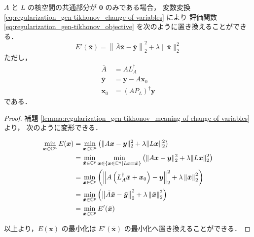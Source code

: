 \begin{theorem}
    $A$ と $L$ の核空間の共通部分が $\bm{0}$ のみである場合，
    変数変換 \eqref{eq:regularization_gen-tikhonov_change-of-variables} により
    評価関数 \eqref{eq:regularization_gen-tikhonov_objective} を次のように置き換えることができる．
    \begin{equation}
        E'(\bar{\bm{x}}) =
        \left\|\bar{A} \bar{\bm{x}} - \bar{\bm{y}}\right\|_2^2
        + \lambda \|\bar{\bm{x}}\|_2^2
    \end{equation}
    ただし，
    \begin{align}
        \bar{A}      & = A L_A^\dagger                     \\
        \bar{\bm{y}} & = \bm{y} - A \bm{x}_0               \\
        \bm{x}_0     & = \left(A P_L\right)^\dagger \bm{y}
    \end{align}
    である．
\end{theorem}
\begin{proof}
    補題 \ref{lemma:regularization_gen-tikhonov_meaning-of-change-of-variables} より，
    次のように変形できる．

    \begin{align}
        \min_{\bm{x}\in\mathbb{C}^n} E(\bm{x})
         & = \min_{\bm{x}\in\mathbb{C}^n} \left( \|A \bm{x} - \bm{y}\|_2^2 + \lambda \|L \bm{x}\|_2^2 \right)
        \notag                                                                                           \\
         & = \min_{\bar{\bm{x}} \in \mathbb{C}^p}
        \min_{\bm{x} \in \{\bm{x} \in \mathbb{C}^n \mid L \bm{x} = \bar{\bm{x}} \}}
        \left( \|A \bm{x} - \bm{y}\|_2^2 + \lambda \|L \bm{x}\|_2^2 \right)
        \notag                                                                                           \\
         & = \min_{\bar{\bm{x}} \in \mathbb{C}^p}
        \left( \left\|A \left(L_A^\dagger \bar{\bm{x}} + \bm{x}_0\right) - \bm{y}\right\|_2^2
        + \lambda \left\|\bar{\bm{x}}\right\|_2^2 \right)
        \notag                                                                                           \\
         & = \min_{\bar{\bm{x}} \in \mathbb{C}^p}
        \left( \left\|\bar{A} \bar{\bm{x}} - \bar{\bm{y}}\right\|_2^2
        + \lambda \left\|\bar{\bm{x}}\right\|_2^2 \right)
        \notag                                                                                           \\
         & = \min_{\bar{\bm{x}} \in \mathbb{C}^p} E'(\bar{\bm{x}})
    \end{align}

    以上より，$E(\bm{x})$ の最小化は $E'(\bar{\bm{x}})$ の最小化へ置き換えることができる．
\end{proof}

